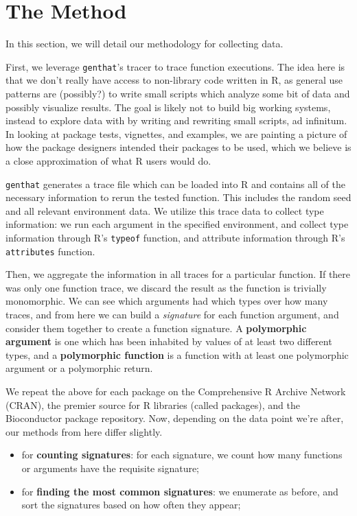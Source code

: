 \documentclass[acmsmall,10pt,review,anonymous]{acmart}\settopmatter{printfolios=true,printccs=false,printacmref=false}
\begin{document}
%


\section{The Method}

In this section, we will detail our methodology for collecting data.

First, we leverage {\tt genthat}'s tracer to trace function executions.  The
idea here is that we don't really have access to non-library code written in
R, as general use patterns are (possibly?) to write small scripts which
analyze some bit of data and possibly visualize results.  The goal is likely
not to build big working systems, instead to explore data with by writing
and rewriting small scripts, ad infinitum.  In looking at package tests,
vignettes, and examples, we are painting a picture of how the package
designers intended their packages to be used, which we believe is a close
approximation of what R users would do.

{\tt genthat} generates a trace file which can be loaded into R and contains
all of the necessary information to rerun the tested function.  This
includes the random seed and all relevant environment data.  We utilize this
trace data to collect type information: we run each argument in the
specified environment, and collect type information through R's {\tt typeof}
function, and attribute information through R's {\tt attributes} function.

Then, we aggregate the information in all traces for a particular function.
If there was only one function trace, we discard the result as the function
is trivially monomorphic.  We can see which arguments had which types over
how many traces, and from here we can build a \textit{signature} for each
function argument, and consider them together to create a function
signature.  A \textbf{polymorphic argument} is one which has been inhabited
by values of at least two different types, and a \textbf{polymorphic
  function} is a function with at least one polymorphic argument or a
polymorphic return.

We repeat the above for each package on the Comprehensive R Archive Network
(CRAN), the premier source for R libraries (called packages), and the
Bioconductor package repository.  Now, depending on the data point we're
after, our methods from here differ slightly.

\begin{itemize}
    \item for \textbf{counting signatures}: for each signature, we count how
      many functions or arguments have the requisite signature;
    \item for \textbf{finding the most common signatures}: we enumerate as
      before, and sort the signatures based on how often they appear;
\end{itemize}
\end{document}
